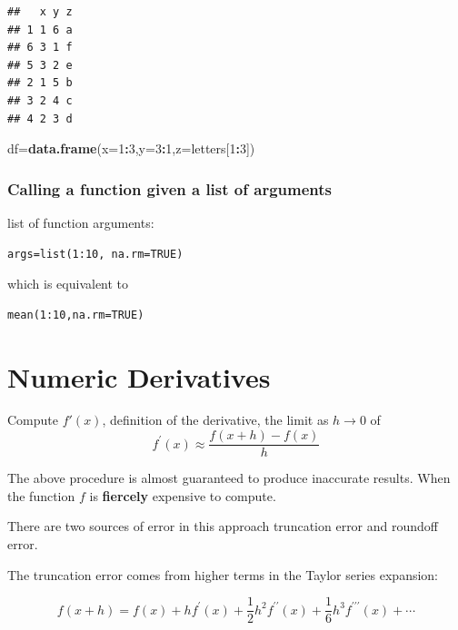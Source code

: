 \documentclass[
]{book}
\newenvironment{Shaded}{\begin{snugshade}}{\end{snugshade}}
\newcommand{\DataTypeTok}[1]{\textcolor[rgb]{0.13,0.29,0.53}{#1}}
\newcommand{\DecValTok}[1]{\textcolor[rgb]{0.00,0.00,0.81}{#1}}
\newcommand{\KeywordTok}[1]{\textcolor[rgb]{0.13,0.29,0.53}{\textbf{#1}}}
\newcommand{\NormalTok}[1]{#1}
\newcommand{\OperatorTok}[1]{\textcolor[rgb]{0.81,0.36,0.00}{\textbf{#1}}}
\theoremstyle{definition}
\theoremstyle{definition}
\theoremstyle{definition}
\theoremstyle{remark}
\begin{document}
\begin{verbatim}
##   x y z
## 1 1 6 a
## 6 3 1 f
## 5 3 2 e
## 2 1 5 b
## 3 2 4 c
## 4 2 3 d
\end{verbatim}

\begin{Shaded}
\begin{Highlighting}[]
\NormalTok{df=}\KeywordTok{data.frame}\NormalTok{(}\DataTypeTok{x=}\DecValTok{1}\OperatorTok{:}\DecValTok{3}\NormalTok{,}\DataTypeTok{y=}\DecValTok{3}\OperatorTok{:}\DecValTok{1}\NormalTok{,}\DataTypeTok{z=}\NormalTok{letters[}\DecValTok{1}\OperatorTok{:}\DecValTok{3}\NormalTok{])}
\end{Highlighting}
\end{Shaded}

\hypertarget{calling-a-function-given-a-list-of-arguments}{%
\subsection{Calling a function given a list of arguments}\label{calling-a-function-given-a-list-of-arguments}}

list of function arguments:

\begin{verbatim}
args=list(1:10, na.rm=TRUE)
\end{verbatim}

which is equivalent to

\begin{verbatim}
mean(1:10,na.rm=TRUE)
\end{verbatim}

\hypertarget{numeric-derivatives}{%
\chapter{Numeric Derivatives}\label{numeric-derivatives}}

Compute \(f'(x)\), definition of the derivative, the limit as \(h\rightarrow 0\) of
\[
f^{\prime}(x) \approx \frac{f(x+h)-f(x)}{h}
\]

The above procedure is almost guaranteed to produce inaccurate results. When the function \(f\) is \textbf{fiercely} expensive to compute.

There are two sources of error in this approach truncation error and roundoff error.

The truncation error comes from higher terms in the Taylor series expansion:

\[
f(x+h)=f(x)+h f^{\prime}(x)+\frac{1}{2} h^{2} f^{\prime \prime}(x)+\frac{1}{6} h^{3} f^{\prime \prime \prime}(x)+\cdots
\]
\end{document}
